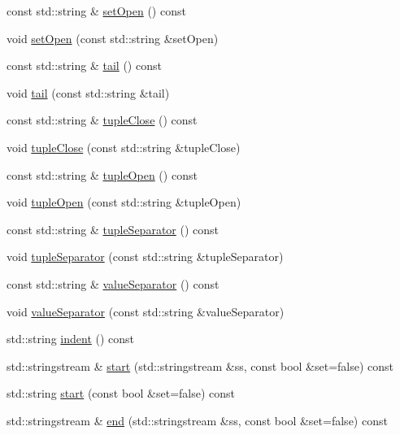 \begin{DoxyCompactItemize}
\item 
const std\+::string \& \hyperlink{classStringFormatter_a138f0dfbbbbf629aab40b9816b075900}{set\+Open} () const
\item 
void \hyperlink{classStringFormatter_ad477eddfe41eb425ddd1b13051d838b9}{set\+Open} (const std\+::string \&set\+Open)
\item 
const std\+::string \& \hyperlink{classStringFormatter_af87d5cdd41e7a3d30893ae2d4cc99a99}{tail} () const
\item 
void \hyperlink{classStringFormatter_ad7a18b6b3c5d10addf6055dd910695c2}{tail} (const std\+::string \&tail)
\item 
const std\+::string \& \hyperlink{classStringFormatter_a35e3c3ce024ea3934bad1e26e85a5ae0}{tuple\+Close} () const
\item 
void \hyperlink{classStringFormatter_adf784178e63ed4533c487e538c1a4390}{tuple\+Close} (const std\+::string \&tuple\+Close)
\item 
const std\+::string \& \hyperlink{classStringFormatter_a3644daa278010496dd9b9066c2e6718c}{tuple\+Open} () const
\item 
void \hyperlink{classStringFormatter_a00feccf99bdd348dd6ffc2af29cb9ec7}{tuple\+Open} (const std\+::string \&tuple\+Open)
\item 
const std\+::string \& \hyperlink{classStringFormatter_afee51fc4fa3fc6fed6afa13fd1aab2de}{tuple\+Separator} () const
\item 
void \hyperlink{classStringFormatter_a5346783f609217a80f49d542e2b4468c}{tuple\+Separator} (const std\+::string \&tuple\+Separator)
\item 
const std\+::string \& \hyperlink{classStringFormatter_a019b766e21b34474a7569d2d12f25d0e}{value\+Separator} () const
\item 
void \hyperlink{classStringFormatter_ad5cd476a9edf0c24717d7edf2d3f4489}{value\+Separator} (const std\+::string \&value\+Separator)
\item 
std\+::string \hyperlink{classStringFormatter_adeedf1dce9545fb00bc070e4caaf30aa}{indent} () const
\item 
std\+::stringstream \& \hyperlink{classStringFormatter_abfaada84b0472d0a41dcd5a56e534808}{start} (std\+::stringstream \&ss, const bool \&set=false) const
\item 
std\+::string \hyperlink{classStringFormatter_aa952e1ec1047f7f0e746f678042da824}{start} (const bool \&set=false) const
\item 
std\+::stringstream \& \hyperlink{classStringFormatter_a951e3aff962bfb69cf745c5b05de26cc}{end} (std\+::stringstream \&ss, const bool \&set=false) const

\end{DoxyCompactItemize}
